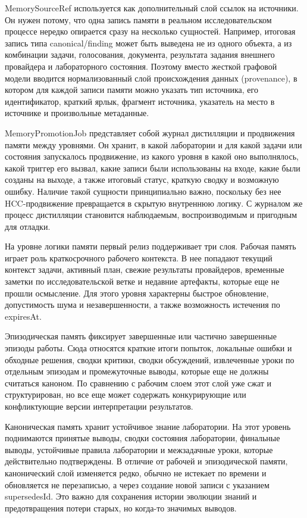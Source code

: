 MemorySourceRef используется как дополнительный слой ссылок на источники. Он нужен потому, что одна запись памяти в реальном исследовательском процессе нередко опирается сразу на несколько сущностей. Например, итоговая запись типа canonical/finding может быть выведена не из одного объекта, а из комбинации задачи, голосования, документа, результата задания внешнего провайдера и лабораторного состояния. Поэтому вместо жесткой графовой модели вводится нормализованный слой происхождения данных (provenance), в котором для каждой записи памяти можно указать тип источника, его идентификатор, краткий ярлык, фрагмент источника, указатель на место в источнике и произвольные метаданные.

MemoryPromotionJob представляет собой журнал дистилляции и продвижения памяти между уровнями. Он хранит, в какой лаборатории и для какой задачи или состояния запускалось продвижение, из какого уровня в какой оно выполнялось, какой триггер его вызвал, какие записи были использованы на входе, какие были созданы на выходе, а также итоговый статус, краткую сводку и возможную ошибку. Наличие такой сущности принципиально важно, поскольку без нее HCC-продвижение превращается в скрытую внутреннюю логику. С журналом же процесс дистилляции становится наблюдаемым, воспроизводимым и пригодным для отладки.

На уровне логики памяти первый релиз поддерживает три слоя. Рабочая память играет роль краткосрочного рабочего контекста. В нее попадают текущий контекст задачи, активный план, свежие результаты провайдеров, временные заметки по исследовательской ветке и недавние артефакты, которые еще не прошли осмысление. Для этого уровня характерны быстрое обновление, допустимость шума и незавершенности, а также возможность истечения по expiresAt.

Эпизодическая память фиксирует завершенные или частично завершенные эпизоды работы. Сюда относятся краткие итоги попыток, локальные ошибки и обходные решения, сводки критики, сводки обсуждений, извлеченные уроки по отдельным эпизодам и промежуточные выводы, которые еще не должны считаться каноном. По сравнению с рабочим слоем этот слой уже сжат и структурирован, но все еще может содержать конкурирующие или конфликтующие версии интерпретации результатов.

Каноническая память хранит устойчивое знание лаборатории. На этот уровень поднимаются принятые выводы, сводки состояния лаборатории, финальные выводы, устойчивые правила лаборатории и межзадачные уроки, которые действительно подтверждены. В отличие от рабочей и эпизодической памяти, канонический слой изменяется редко, обычно не истекает по времени и обновляется не перезаписью, а через создание новой записи с указанием supersedesId. Это важно для сохранения истории эволюции знаний и предотвращения потери старых, но когда-то значимых выводов.

